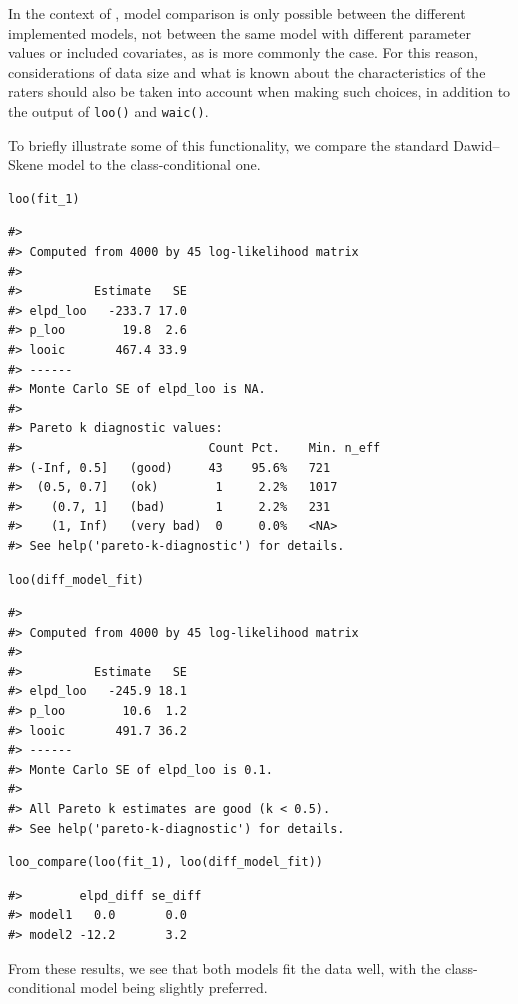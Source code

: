 In the context of , model comparison is only possible between
the different implemented models, not between the same model with different
parameter values or included covariates, as is more commonly the case. For
this reason, considerations of data size and what is known about the
characteristics of the raters should also be taken into account when making
such choices, in addition to the output of \texttt{loo()} and \texttt{waic()}.

To briefly illustrate some of this functionality, we compare the standard
Dawid--Skene model to the class-conditional one.

\begin{verbatim}
loo(fit_1)
\end{verbatim}

\begin{verbatim}
#> 
#> Computed from 4000 by 45 log-likelihood matrix
#> 
#>          Estimate   SE
#> elpd_loo   -233.7 17.0
#> p_loo        19.8  2.6
#> looic       467.4 33.9
#> ------
#> Monte Carlo SE of elpd_loo is NA.
#> 
#> Pareto k diagnostic values:
#>                          Count Pct.    Min. n_eff
#> (-Inf, 0.5]   (good)     43    95.6%   721       
#>  (0.5, 0.7]   (ok)        1     2.2%   1017      
#>    (0.7, 1]   (bad)       1     2.2%   231       
#>    (1, Inf)   (very bad)  0     0.0%   <NA>      
#> See help('pareto-k-diagnostic') for details.
\end{verbatim}

\begin{verbatim}
loo(diff_model_fit)
\end{verbatim}

\begin{verbatim}
#> 
#> Computed from 4000 by 45 log-likelihood matrix
#> 
#>          Estimate   SE
#> elpd_loo   -245.9 18.1
#> p_loo        10.6  1.2
#> looic       491.7 36.2
#> ------
#> Monte Carlo SE of elpd_loo is 0.1.
#> 
#> All Pareto k estimates are good (k < 0.5).
#> See help('pareto-k-diagnostic') for details.
\end{verbatim}

\begin{verbatim}
loo_compare(loo(fit_1), loo(diff_model_fit))
\end{verbatim}

\begin{verbatim}
#>        elpd_diff se_diff
#> model1   0.0       0.0  
#> model2 -12.2       3.2
\end{verbatim}

From these results, we see that both models fit the data well, with the
class-conditional model being slightly preferred.

